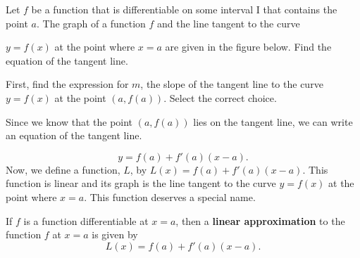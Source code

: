 \documentclass{ximera}
\begin{document}
\begin{example}
Let $f$ be a function that is differentiable on some interval I that contains the point $a$. The graph of a function $f$  and the line tangent to the curve

 $y=f(x)$ at the point where $x=a$ are given in the figure below.
Find the equation of the tangent line.
 \begin{image}
\end{image}
First, find the expression for $m$, the slope of the tangent line to the curve $y=f(x)$ at the point $(a,f(a))$.
 Select the correct choice.
 \begin{multipleChoice}

  \end{multipleChoice}
Since we know that the point $(a,f(a))$  lies on the tangent line,  we can write an equation of the tangent line. 

\[
y= f(a)+f'(a)(x-a).
\]
Now, we define a function, $L$,  by $L(x)= f(a)+f'(a)(x-a)$. This function is linear and its graph is the line tangent to the curve $y=f(x)$ at the point where $x=a$.
This function deserves a special name.
\end{example}
\begin{definition}
If $f$ is a function differentiable at $x=a$, then a \textbf{linear
  approximation} to the function $f$ at $x=a$ is given by
\[
L(x) =f(a)+ f'(a)(x-a).
\]
\end{definition}
\end{document}
